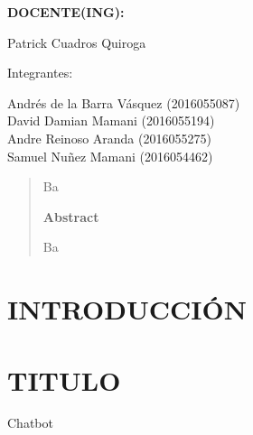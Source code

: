 \documentclass[12pt,letterpaper]{article}
\begin{document}
\begin{titlepage}
\begin{center}
\vspace*{0.3in}
\begin{Large}
\textbf{DOCENTE(ING):} \\
\end{Large}

\vspace*{0.1in}
\begin{large}
 Patrick Cuadros Quiroga\\
\end{large}

\vspace*{0.2in}
\vspace*{0.1in}
\begin{large}
Integrantes: \\
\begin{flushleft}

Andrés de la Barra Vásquez            	\hfill	(2016055087) \\
David Damian Mamani 			\hfill	(2016055194) \\
Andre Reinoso Aranda 			\hfill	(2016055275) \\
Samuel Nuñez Mamani 			\hfill	(2016054462) \\

\end{flushleft}
\end{large}
\end{center}

\end{titlepage}


\tableofcontents %
\thispagestyle{empty} %
\newpage
\setcounter{page}{1} %

\begin{abstract}

Ba


\begin{center}
\textbf{Abstract}
\end{center}
Ba

\end{abstract}
\newpage
\section{INTRODUCCIÓN} 



\newpage
\section{TITULO}
	\par Chatbot
\end{document}

